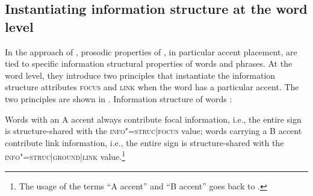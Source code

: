 \documentclass[output=paper,biblatex,babelshorthands,newtxmath,draftmode,colorlinks,citecolor=brown]{langscibook}
\begin{document}
\subsection{Instantiating information structure at the word level}
\label{sec:instant}

In the approach of \citet{EV96a}, prosodic properties of
, in particular accent placement, are tied to specific information
structural properties of words and phrases. At the word level, they
introduce two principles that instantiate the information
structure attributes \textsc{focus} and \textsc{link} when the word has a
particular accent. The two principles are shown in
.
\ea
Information structure of words \citep[56]{EV96a}:\\

  \label{fig:engdahl-word-principle}
\z
Words with an A accent always contribute focal information, i.e., the
entire sign is structure-shared with the \textsc{info"=struc|focus}
value; words carrying a B accent contribute link information, i.e., the
entire sign is structure-shared with the
\textsc{info"=struc|ground|link} value.\footnote{The usage of the terms ``A accent'' and ``B accent'' goes back to \citet[259]{Jackendoff72a-u}.}
\end{document}
